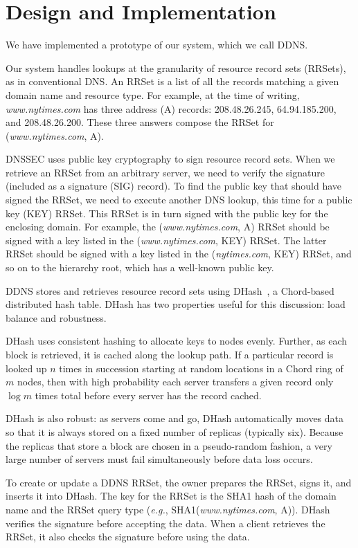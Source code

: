 \section{Design and Implementation}

We have implemented a prototype of our system,
which we call DDNS.

Our system handles lookups at the granularity of resource record sets (RRSets),
as in conventional DNS.
An RRSet is a list of all the records matching a
given domain name and resource type.
For example, at the time of writing, {\em www.nytimes.com}
has three address (A) records: 208.48.26.245, 64.94.185.200,
and 208.48.26.200.  These three answers compose the RRSet
for ({\em www.nytimes.com}, A).

DNSSEC uses public key cryptography to sign resource record
sets.  When we retrieve an RRSet from an arbitrary
server, we need to verify the signature (included as a 
signature (SIG) record).
To find the public key that should have signed the RRSet,
we need to execute another DNS lookup, 
this time for a public key (KEY) RRSet.
This RRSet is in turn signed with the public key for the
enclosing domain.
For example, the ({\em www.nytimes.com}, A) RRSet should
be signed with a key listed in the ({\em www.nytimes.com}, KEY) RRSet.
The latter RRSet should be signed with a key
listed in the ({\em nytimes.com}, KEY)
RRSet, and so on to the hierarchy root,
which has a well-known public key.

DDNS stores and retrieves resource record sets using
DHash~\cite{cfs:sosp01}, a Chord-based distributed hash table.
DHash has two properties useful for this
discussion: load balance and robustness.

DHash uses consistent hashing to allocate keys to nodes evenly.
Further, as each block is retrieved, it is cached along
the lookup path.
If a particular record is looked up $n$ times in succession
starting at random locations in a Chord ring of $m$ nodes, 
then with high probability
each server transfers a given record only $\log{m}$ times total
before every server has the record cached.

DHash is also robust: as servers come and go, DHash automatically
moves data so that it is always stored on a fixed number of replicas
(typically six).  Because the replicas that store a block are chosen
in a pseudo-random fashion, a very large number of servers must
fail simultaneously before data loss occurs. 

To create or update a DDNS RRSet, the owner prepares
the RRSet, signs it, and inserts it into DHash.
The key for the RRSet is the SHA1 hash of the domain name and the RRSet query type
({\em e.g.}, SHA1({\em www.nytimes.com}, A)).
DHash verifies the signature before accepting the data.
When a client retrieves the RRSet, it also checks 
the signature before using the data.

